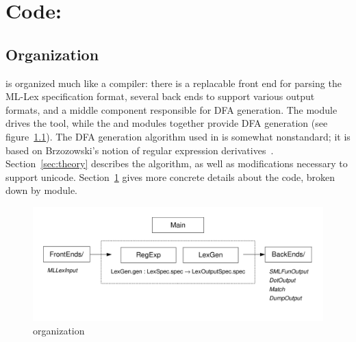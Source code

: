 \chapter[\ulex]{Code: \ulex}\label{sec:code}

\section{Organization}


\ulex{} is organized much like a compiler: there is a replacable front end for
parsing the ML-Lex specification format, several back ends to support various
output formats, and a middle component responsible for DFA generation.  The
 module drives the tool, while the  and  modules
together provide DFA generation (see figure~\ref{fig:ml-flex}).  The DFA
generation algorithm used in \ulex{} is somewhat nonstandard; it is based on
Brzozowski's notion of regular expression derivatives~\cite{derivatives}. 
Section~\ref{sec:theory} describes the algorithm, as well as modifications
necessary to support unicode.  Section~\ref{sec:code} gives more concrete
details about the code, broken down by module.

\begin{figure}\label{fig:ml-flex}
\begin{center}
\ifpdf
  \includegraphics[scale=0.8]{impl-pic.pdf}
\fi
\end{center}
\caption{\ulex{} organization}
\end{figure}

\section{}\label{sec:reg-exp}

